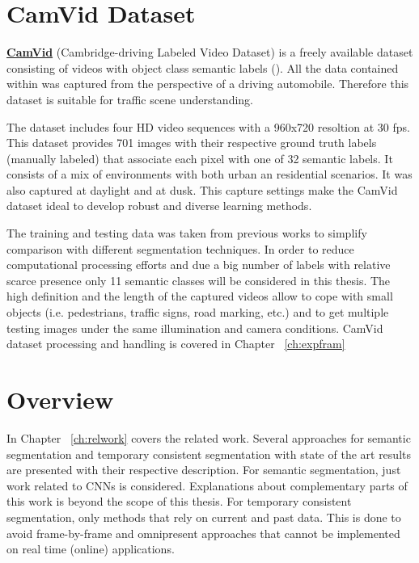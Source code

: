 \section{CamVid Dataset}
\label{sec:camvid}

\href{http://mi.eng.cam.ac.uk/research/projects/VideoRec/CamVid/}{\textbf{CamVid}} (Cambridge-driving Labeled Video Dataset) is a freely available dataset consisting of videos with object class semantic labels (\textcite{BrostowFC:PRL2008}). All the data contained within was captured from the perspective of a driving automobile. Therefore this dataset is suitable for traffic scene understanding.

The dataset includes four HD video sequences with a 960x720 resoltion at 30 fps. This dataset provides 701 images with their respective ground truth labels (manually labeled) that associate each pixel with one of 32 semantic labels. It consists of a mix of environments with both urban an residential scenarios. It was also captured at daylight and at dusk. This capture settings make the CamVid dataset ideal to develop robust and diverse learning methods. 

The training and testing data was taken from previous works \textcite{BrostowSFC:ECCV08}  to simplify comparison with different segmentation techniques. In order to reduce computational processing efforts and due a big number of labels with relative scarce presence only 11 semantic classes will be considered in this thesis. The high definition and the length of the captured videos allow to cope with small objects (i.e. pedestrians, traffic signs, road marking, etc.) and to get multiple testing images under the same illumination and camera conditions. CamVid dataset processing and handling is covered in Chapter ~\ref{ch:expfram}

\section{Overview}
\label{sec:overview}

In Chapter ~\ref{ch:relwork} covers the related work. Several approaches for semantic segmentation and temporary consistent segmentation with state of the art results are presented with their respective description. For semantic segmentation, just work related to CNNs is considered. Explanations about complementary parts of this work is beyond the scope of this thesis. For temporary consistent segmentation, only methods that rely on current and past data. This is done to avoid frame-by-frame and omnipresent approaches that cannot be implemented on real time (online) applications.

